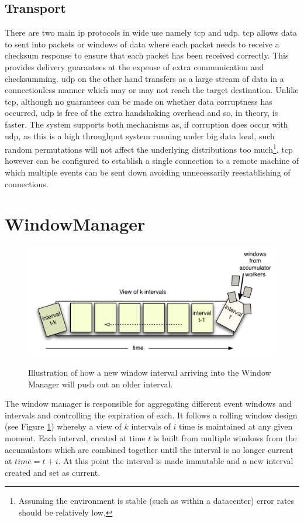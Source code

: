 \documentclass[a4paper,11pt]{scrreprt}
\begin{document}
\subsection{Transport}
There are two main \acrshort{ip} protocols in wide use namely \acrshort{tcp} and \acrshort{udp}. \acrshort{tcp} allows data to sent into packets or windows of data where each packet needs to receive a checksum response to ensure that each packet has been received correctly. This provides delivery guarantees at the expense of extra communication and checksumming. \acrshort{udp} on the other hand transfers as a large stream of data in a connectionless manner which may or may not reach the target destination. Unlike \acrshort{tcp}, although no guarantees can be made on whether data corruptness has occurred, \acrshort{udp} is free of the extra handshaking overhead and so, in theory, is faster. The system supports both mechanisms as, if corruption does occur with \acrshort{udp}, as this is a high throughput system running under big data load, such random permutations will not affect the underlying distributions too much\footnote{Assuming the environment is stable (such as within a datacenter) error rates should be relatively low.}. \acrshort{tcp} however can be configured to establish a single connection to a remote machine of which multiple events can be sent down avoiding unnecessarily reestablishing of connections.
\section{WindowManager}
\begin{figure}[h!]
\centering
\caption{Illustration of how a new window interval arriving into the Window Manager will push out an older interval.}
\includegraphics[scale=0.72, trim=0 0 0 12, clip=true] {window.pdf}
\label{fig:rollingwindow}
\end{figure}
The window manager is responsible for aggregating different event windows and intervals and controlling the expiration of each. It follows a rolling window design (see Figure \ref{fig:rollingwindow}) whereby a view of \(k\) intervals of \(i\) time is maintained at any given moment. Each interval, created at time \(t\) is built from multiple windows from the accumulators which are combined together until the interval is no longer current at \(time = t+i\). At this point the interval is made immutable and a new interval created and set as current. 
\end{document}
